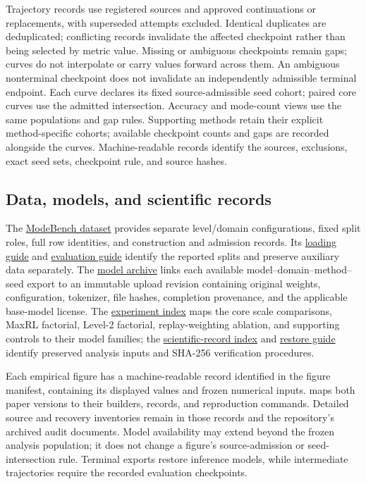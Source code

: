 \documentclass{article}
\newcommand{\1}{\mathbf 1}
\theoremstyle{remark}
\theoremstyle{definition}
\theoremstyle{plain}
\begin{document}
Trajectory records use registered sources and approved continuations or
replacements, with superseded attempts excluded. Identical duplicates are
deduplicated; conflicting records invalidate the affected checkpoint rather
than being selected by metric value. Missing or ambiguous checkpoints remain gaps;
curves do not interpolate or carry values forward across them. An ambiguous
nonterminal checkpoint does not invalidate an independently admissible
terminal endpoint. Each curve declares its fixed source-admissible seed cohort; paired core
curves use the admitted intersection. Accuracy and mode-count views use
the same populations and gap rules. Supporting methods retain their
explicit method-specific cohorts; available checkpoint counts and gaps
are recorded alongside the curves. Machine-readable records identify the
sources, exclusions, exact seed sets, checkpoint rule, and source hashes.

\subsection{Data, models, and scientific records}
\label{app:repro-artifacts}
\label{app:repro-code}
\label{app:archived-models}

The \href{https://huggingface.co/datasets/od2961/ModeBench}{ModeBench dataset}
provides separate level/domain configurations, fixed split roles, full row
identities, and construction and admission records. Its
\href{https://huggingface.co/datasets/od2961/ModeBench\#loading}{loading guide}
and \href{https://huggingface.co/datasets/od2961/ModeBench\#evaluation}{evaluation guide}
identify the reported splits and preserve auxiliary data separately.
The \href{https://huggingface.co/od2961/maxent-grpo-models}{model archive}
links each available model--domain--method--seed export to an immutable
upload revision containing original weights, configuration, tokenizer,
file hashes, completion provenance, and the applicable base-model license.
The \href{https://huggingface.co/od2961/maxent-grpo-models/blob/main/EXPERIMENTS.md}{experiment index}
maps the core scale comparisons, MaxRL factorial, Level-2 factorial,
replay-weighting ablation, and supporting controls to their model families;
the \href{https://huggingface.co/od2961/maxent-grpo-models/blob/main/DATA.md}{scientific-record index}
and \href{https://huggingface.co/od2961/maxent-grpo-models/blob/main/RESTORE.md}{restore guide}
identify preserved analysis inputs and SHA-256 verification procedures.

Each empirical figure has a machine-readable record identified in the
figure manifest, containing its displayed values and frozen numerical inputs.
 maps both paper versions to their builders,
records, and reproduction commands. Detailed source and recovery inventories
remain in those records and the repository's archived audit documents.
Model availability may extend beyond the frozen analysis population; it
does not change a figure's source-admission or seed-intersection rule.
Terminal exports restore inference models, while intermediate trajectories
require the recorded evaluation checkpoints.
\end{document}
